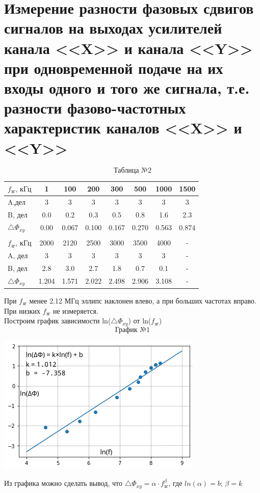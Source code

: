 \documentclass[a4paper,12pt]{article} %
\begin{document}
\section{Измерение разности фазовых сдвигов сигналов на выходах усилителей канала <<X>> и канала <<Y>> при одновременной подаче на их входы одного и того же сигнала, т.е. разности фазово-частотных характеристик каналов <<X>> и <<Y>>}
\begin{center}
\[\text{Таблица №2}\]
\begin{tabular}[h]{|l|c|c|c|c|c|c|c|}
\hline
$f_{\text{зг}}\text{, кГц}$           & 1     & 100   & 200   & 300   & 500   & 1000  & 1500  \\ \hline
A,дел           & 3     & 3     & 3     & 3     & 3     & 3     & 3     \\ \hline
B, дел           & 0.0     & 0.2   & 0.3   & 0.5   & 0.8   & 1.6   & 2.3   \\ \hline
$\bigtriangleup\Phi_{xy}$ & 0.00     & 0.067 & 0.100   & 0.167 & 0.270  & 0.563 & 0.874 \\ \hline
\multicolumn{8}{|l|}{}                                              \\ \hline
$f_{\text{зг}}\text{, кГц}$           & 2000  & 2120  & 2500  & 3000  & 3500  & 4000  & -     \\ \hline
A, дел           & 3     & 3     & 3     & 3     & 3     & 3     & -     \\ \hline
B, дел           & 2.8   & 3.0     & 2.7   & 1.8   & 0.7   & 0.1   & -     \\ \hline
$\bigtriangleup\Phi_{xy}$          & 1.204 & 1.571 & 2.022 & 2.498 & 2.906 & 3.108 & -     \\ \hline
\end{tabular}
\end{center}
При $f_{\text{зг}}$ менее 2.12 МГц эллипс наклонен влево, а при больших частотах вправо. При низких $f_{\text{зг}}$ не измеряется.\\
Построим график зависимости ln($\bigtriangleup\Phi_{xy}$) от ln($f_{\text{зг}}$)
\[\text{График №1}\]
\begin{center}
\includegraphics[scale=0.75]{fig}
\end{center}
Из графика можно сделать вывод, что $\bigtriangleup\Phi_{xy} = \alpha \cdot f_{\text{зг}}^{\beta}$, где $ln(\alpha) = b\text{; } \beta = k$
\end{document}
